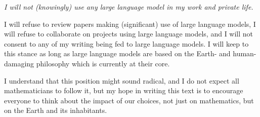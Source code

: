 \documentclass[a4paper,12pt]{article}
\begin{document}
	\medskip
	
	\emph{I will not (knowingly) use any large language model in my work and private life.}
	
	\medskip
	
	I will refuse to review papers making (significant) use of large language models, I will refuse to collaborate on projects using large language models, and I will not consent to any of my writing being fed to large language models.
	I will keep to this stance as long as large language models are based on the Earth- and human-damaging philosophy which is currently at their core.
	
	I understand that this position might sound radical, and I do not expect all mathematicians to follow it, but my hope in writing this text is to encourage everyone to think about the impact of our choices, not just on mathematics, but on the Earth and its inhabitants.
	
	\printbibliography
\end{document}
